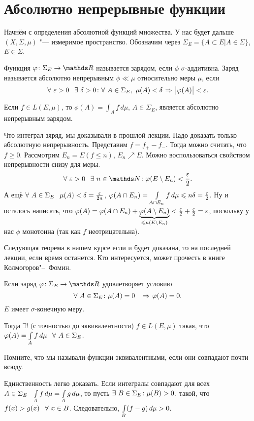 \section{Абсолютно непрерывные функции}
Начнём с определения абсолютной функций множества. У нас будет дальше $(X,\Sigma,\mu)$ "--- измеримое пространство. Обозначим через $\Sigma_E=\{A\subset E|A\in\Sigma\}$, $E\in\Sigma$.
\begin{Def}
 Функция $\phi\colon \Sigma_E\to\R$ называется зарядом, если $\phi$ $\sigma$-аддитивна. Заряд называется абсолютно непрерывным $\phi\ll\mu$ относительно меры $\mu$, если 
 \[
  \forall\ \e>0\pau\exists\ \delta>0\colon \forall\ A\in\Sigma_E,\ \mu(A)<\delta\imp\big|\phi(A)\big|<\e.
\]
\end{Def}

\begin{The}
  Если $f\in L(E,\mu)$, то $\phi(A) =\int_A f\,d\mu$, $A\in \Sigma_E$, является абсолютно непрерывным зарядом.
\end{The}

\begin{Proof}
  Что интеграл зяряд, мы доказывали в прошлой лекции. Надо доказать только абсолютную непрерывность. Представим $f=f_+-f_-$. Тогда можно считать, что $f\ge 0$. Рассмотрим $E_n=E(f\le n)$, $E_n\nearrow E$. Можно воспользоваться свойством непрерывности снизу для меры.
\[
  \forall\ \e>0\pau\exists\ n\in\N\colon \phi(E\dd E_n)<\frac\e2.
\]
А ещё $\forall\ A\in \E_E\pau \mu(A)<\delta = \frac\e{2n}$, $\varphi(A\cap E_n)=\int\limits_{A\cap E_n}f\,d\mu\leqslant n\delta=\frac{\varepsilon}2$.
Ну и осталось написать, что $\phi(A)\hm=\phi(A\cap E_n)+\underbrace{\phi(A\dd E_n)}_{\le\mu(E\dd E_n)}<\frac\e2+\frac\e2=\e$, поскольку у нас $\phi$ монотонна (так как $f$ неотрицательна).
\end{Proof}

Следующая теорема в нашем курсе если и будет доказана, то на последней лекции, если время останется. Кто интересуется, может прочесть в книге Колмогоров"--~Фомин.
\begin{The}
  Если заряд $\phi\colon \E_E\to\R$ удовлетворяет условию
\[
  \forall\ A\in\E_E\colon \mu(A)=0\pau \imp\phi(A)=0.
\]
$E$ имеет $\sigma$-конечную меру.

Тогда $\exists!$ (с точностью до эквивалентности) $f\in L(E,\mu)$ такая, что $\phi(A) = \I Af\pau \forall\ A\in\E_E$.
\end{The}
Помните, что мы называли функции эквивалентными, если они совпадают почти всюду.
\begin{Proof}
 Единственность легко доказать. Если интегралы совпадают для всех $A\in\E_E\pau \I Af=\I Ag$, то пусть $\exists\ B\in\Sigma_E\colon \mu(B)>0$, такой, что $f(x)>g(x)\pau \forall\ x\in B$. Следовательно, $\int\limits_{B}(f-g)\,d\mu>0$.
\end{Proof}

